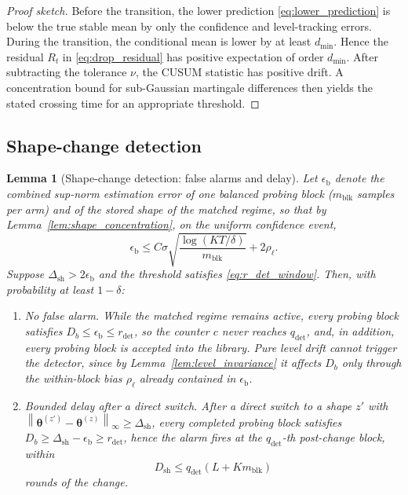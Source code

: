 \documentclass[11pt]{article}
\newtheorem{lemma}{Lemma}
\newcommand{\norm}[1]{\left\lVert #1 \right\rVert}
\begin{document}
\begin{proof}[Proof sketch]
Before the transition, the lower prediction \eqref{eq:lower_prediction} is below the true stable mean by only the confidence and level-tracking errors. During the transition, the conditional mean is lower by at least $d_{\min}$. Hence the residual $R_t$ in \eqref{eq:drop_residual} has positive expectation of order $d_{\min}$. After subtracting the tolerance $\nu$, the CUSUM statistic has positive drift. A concentration bound for sub-Gaussian martingale differences then yields the stated crossing time for an appropriate threshold.
\end{proof}

\subsection{Shape-change detection}
\label{subsec:shape_detection_proof}

\begin{lemma}[Shape-change detection: false alarms and delay]
\label{lem:shape_detection}
Let $\epsilon_{\mathrm{b}}$ denote the combined sup-norm estimation error of one balanced probing block ($m_{\mathrm{blk}}$ samples per arm) and of the stored shape of the matched regime, so that by Lemma~\ref{lem:shape_concentration}, on the uniform confidence event,
\begin{equation}
\label{eq:eps_blk}
\epsilon_{\mathrm{b}}
\leq
C\sigma\sqrt{\frac{\log(KT/\delta)}{m_{\mathrm{blk}}}}
+2\rho_{\ell}.
\end{equation}
Suppose $\Delta_{\mathrm{sh}}>2\epsilon_{\mathrm{b}}$ and the threshold satisfies \eqref{eq:r_det_window}. Then, with probability at least $1-\delta$:
\begin{enumerate}
\item \emph{No false alarm.} While the matched regime remains active, every probing block satisfies $D_b\leq\epsilon_{\mathrm{b}}\leq r_{\mathrm{det}}$, so the counter $c$ never reaches $q_{\mathrm{det}}$, and, in addition, every probing block is accepted into the library. Pure level drift cannot trigger the detector, since by Lemma~\ref{lem:level_invariance} it affects $D_b$ only through the within-block bias $\rho_{\ell}$ already contained in $\epsilon_{\mathrm{b}}$.
\item \emph{Bounded delay after a direct switch.} After a direct switch to a shape $z'$ with $\norm{\bm\theta^{(z')}-\bm\theta^{(z)}}_{\infty}\geq\Delta_{\mathrm{sh}}$, every completed probing block satisfies
$D_b\geq\Delta_{\mathrm{sh}}-\epsilon_{\mathrm{b}}\geq r_{\mathrm{det}}$,
hence the alarm fires at the $q_{\mathrm{det}}$-th post-change block, within
\begin{equation}
\label{eq:shape_detection_delay}
D_{\mathrm{sh}}
\leq
q_{\mathrm{det}}\left(L+Km_{\mathrm{blk}}\right)
\end{equation}
rounds of the change.
\end{enumerate}
\end{lemma}
\end{document}
